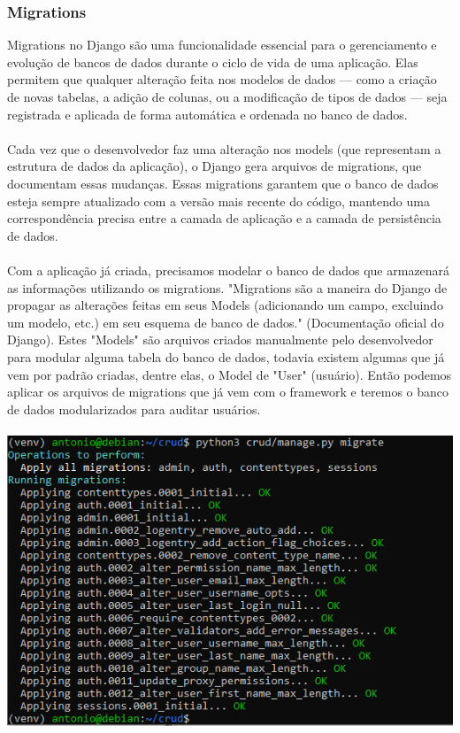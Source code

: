 \documentclass[11pt]{article} %
\begin{document}
\subsubsection{Migrations}
Migrations no Django são uma funcionalidade essencial para o gerenciamento e evolução de bancos de dados durante o ciclo de vida de uma aplicação. Elas permitem que qualquer alteração feita nos modelos de dados — como a criação de novas tabelas, a adição de colunas, ou a modificação de tipos de dados — seja registrada e aplicada de forma automática e ordenada no banco de dados.\\\\
Cada vez que o desenvolvedor faz uma alteração nos models (que representam a estrutura de dados da aplicação), o Django gera arquivos de migrations, que documentam essas mudanças. Essas migrations garantem que o banco de dados esteja sempre atualizado com a versão mais recente do código, mantendo uma correspondência precisa entre a camada de aplicação e a camada de persistência de dados.\\\\
Com a aplicação já criada, precisamos modelar o banco de dados que armazenará as informações utilizando os migrations. "Migrations são a maneira do Django de propagar as alterações feitas em seus Models (adicionando um campo, excluindo um modelo, etc.) em seu esquema de banco de dados." (Documentação oficial do Django). Estes "Models" são arquivos criados manualmente pelo desenvolvedor para modular alguma tabela do banco de dados, todavia existem algumas que já vem por padrão criadas, dentre elas, o Model de "User" (usuário). Então podemos aplicar os arquivos de migrations que já vem com o framework e teremos o banco de dados modularizados para auditar usuários.\\\\
\includegraphics[]{images/s6.PNG}
\end{document}
